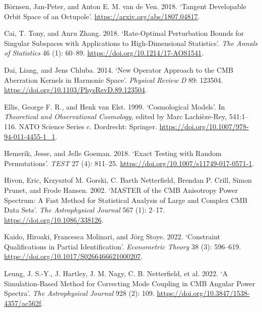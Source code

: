 \documentclass[
  11pt,
  a4paper]{article}
\newlength{\cslhangindent}
\newlength{\cslentryspacingunit} %
\newenvironment{CSLReferences}[2] %
 {%
  \setlength{\parindent}{0pt}
  \ifodd #1
  \let\oldpar\par
  \def\par{\hangindent=\cslhangindent\oldpar}
  \fi
  \setlength{\parskip}{#2\cslentryspacingunit}
 }%
 {}
\begin{document}
\hypertarget{refs}{}
\begin{CSLReferences}{1}{0}
\leavevmode{}%
Börnsen, Jan-Peter, and Anton E. M. van de Ven. 2018. {`Tangent Developable Orbit Space of an Octupole'}. \url{https://arxiv.org/abs/1807.04817}.

\leavevmode{}%
Cai, T. Tony, and Anru Zhang. 2018. {`Rate-Optimal Perturbation Bounds for Singular Subspaces with Applications to High-Dimensional Statistics'}. \emph{The Annals of Statistics} 46 (1): 60--89. \url{https://doi.org/10.1214/17-AOS1541}.

\leavevmode{}%
Dai, Liang, and Jens Chluba. 2014. {`New Operator Approach to the {CMB} Aberration Kernels in Harmonic Space'}. \emph{Physical Review D} 89: 123504. \url{https://doi.org/10.1103/PhysRevD.89.123504}.

\leavevmode{}%
Ellis, George F. R., and Henk van Elst. 1999. {`Cosmological Models'}. In \emph{Theoretical and Observational Cosmology}, edited by Marc Lachièze-Rey, 541:1--116. NATO Science Series c. Dordrecht: Springer. \url{https://doi.org/10.1007/978-94-011-4455-1_1}.

\leavevmode{}%
Hemerik, Jesse, and Jelle Goeman. 2018. {`Exact Testing with Random Permutations'}. \emph{TEST} 27 (4): 811--25. \url{https://doi.org/10.1007/s11749-017-0571-1}.

\leavevmode{}%
Hivon, Eric, Krzysztof M. Gorski, C. Barth Netterfield, Brendan P. Crill, Simon Prunet, and Frode Hansen. 2002. {`{MASTER} of the {CMB} Anisotropy Power Spectrum: A Fast Method for Statistical Analysis of Large and Complex {CMB} Data Sets'}. \emph{The Astrophysical Journal} 567 (1): 2--17. \url{https://doi.org/10.1086/338126}.

\leavevmode{}%
Kaido, Hiroaki, Francesca Molinari, and Jörg Stoye. 2022. {`Constraint Qualifications in Partial Identification'}. \emph{Econometric Theory} 38 (3): 596--619. \url{https://doi.org/10.1017/S0266466621000207}.

\leavevmode{}%
Leung, J. S.-Y., J. Hartley, J. M. Nagy, C. B. Netterfield, et al. 2022. {`A Simulation-Based Method for Correcting Mode Coupling in {CMB} Angular Power Spectra'}. \emph{The Astrophysical Journal} 928 (2): 109. \url{https://doi.org/10.3847/1538-4357/ac562f}.


\end{CSLReferences}
\end{document}
